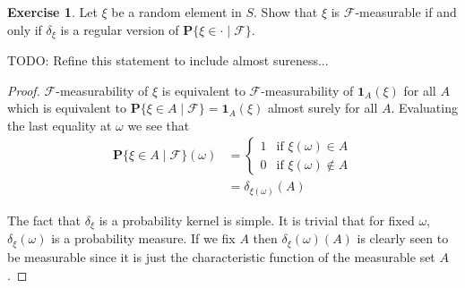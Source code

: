\documentclass{amsbook}
\theoremstyle{definition}
\newtheorem{xca}{Exercise}
\theoremstyle{remark}
\newcommand{\cprobability}[2]{\textbf{P}\{#2 \mid #1\}}
\newcommand{\characteristic}[1]{\textbf{1}_{#1}}
\begin{document}
\begin{xca}Let $\xi$ be a random element in $S$.  Show that $\xi$ is
  $\mathcal{F}$-measurable if and only if $\delta_\xi$ is a regular
  version of 
  $\cprobability{\mathcal{F}}{\xi \in \cdot}$.

TODO: Refine this statement to include almost sureness...
\end{xca}
\begin{proof}
$\mathcal{F}$-measurability of $\xi$ is equivalent to
$\mathcal{F}$-measurability of $\characteristic{A}(\xi)$ for all $A$
which is equivalent to $\cprobability{\mathcal{F}}{\xi \in A} =
\characteristic{A}(\xi)$ almost surely for all $A$.  Evaluating the
last equality at $\omega$ we see that 
\begin{align*}
\cprobability{\mathcal{F}}{\xi \in A}(\omega) &= \begin{cases}
1 & \text{if $\xi(\omega) \in A$} \\
0 & \text{if $\xi(\omega) \notin A$} 
\end{cases}\\
&= \delta_{\xi(\omega)}(A)
\end{align*}

The fact that $\delta_\xi$ is a probability kernel is simple.  It is
trivial that for fixed $\omega$, $\delta_\xi(\omega)$ is a probability
measure.  If we fix $A$ then $\delta_\xi(\omega)(A)$ is clearly seen
to be measurable since it is just the characteristic function of the
measurable set $A$.
\end{proof}
\end{document}
